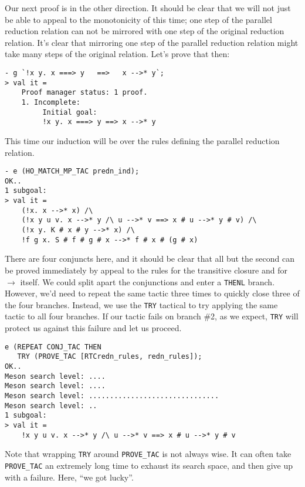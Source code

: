 \documentclass[12pt]{article}
\begin{document}
Our next proof is in the other direction.  It should be clear that we
will not just be able to appeal to the monotonicity of  this
time; one step of the parallel reduction relation can not be mirrored
with one step of the original reduction relation.  It's clear that
mirroring one step of the parallel reduction relation might take many
steps of the original relation.  Let's prove that then:
\begin{session}\begin{verbatim}
- g `!x y. x ===> y   ==>   x -->* y`;
> val it =
    Proof manager status: 1 proof.
    1. Incomplete:
         Initial goal:
         !x y. x ===> y ==> x -->* y
\end{verbatim}\end{session}
This time our induction will be over the rules defining the parallel
reduction relation.
\begin{session}\begin{verbatim}
- e (HO_MATCH_MP_TAC predn_ind);
OK..
1 subgoal:
> val it =
    (!x. x -->* x) /\
    (!x y u v. x -->* y /\ u -->* v ==> x # u -->* y # v) /\
    (!x y. K # x # y -->* x) /\
    !f g x. S # f # g # x -->* f # x # (g # x)
\end{verbatim}\end{session}
    There are four conjuncts here, and it should be clear that all but
    the second can be proved immediately by appeal to the rules for
    the transitive closure and for $\rightarrow$ itself.  We could
    split apart the conjunctions and enter a \texttt{THENL} branch.
    However, we'd need to repeat the same tactic three times to
    quickly close three of the four branches.  Instead, we use the
    \texttt{TRY} tactical to try applying the same tactic to all four
    branches.  If our tactic fails on branch \#2, as we expect,
    \texttt{TRY} will protect us against this failure and let us
    proceed.
\begin{session}\begin{verbatim}
e (REPEAT CONJ_TAC THEN
   TRY (PROVE_TAC [RTCredn_rules, redn_rules]);
OK..
Meson search level: ....
Meson search level: ....
Meson search level: ...............................
Meson search level: ..
1 subgoal:
> val it =
    !x y u v. x -->* y /\ u -->* v ==> x # u -->* y # v
\end{verbatim}\end{session}
    Note that wrapping \texttt{TRY} around \texttt{PROVE\_TAC} is not
    always wise.  It can often take \texttt{PROVE\_TAC} an extremely
    long time to exhaust its search space, and then give up with a
    failure.  Here, ``we got lucky''.
\end{document}
